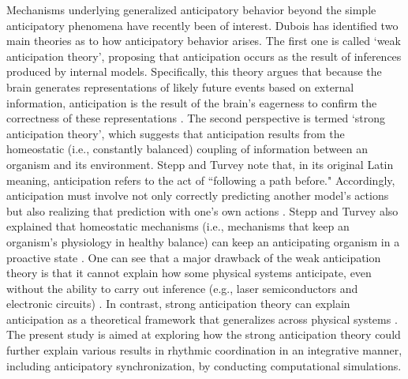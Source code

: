 \documentclass{report}
\begin{document}
Mechanisms underlying generalized anticipatory behavior beyond the simple anticipatory phenomena have recently been of interest. Dubois \cite{dubois2001incursive} has identified two main theories as to how anticipatory behavior arises. The first one is called `weak anticipation theory', proposing that anticipation occurs as the result of inferences produced by internal models. Specifically, this theory argues that because the brain generates representations of likely future events based on external information, anticipation is the result of the brain's eagerness to confirm the correctness of these representations \cite{clark1998being, clark1999towards}. The second perspective is termed `strong anticipation theory', which suggests that anticipation results from the homeostatic (i.e., constantly balanced) coupling of information between an organism and its environment. Stepp and Turvey \cite{stepp2010strong} note that, in its original Latin meaning, anticipation refers to the act of ``following a path before." Accordingly, anticipation must involve not only correctly predicting another model's actions but also realizing that prediction with one's own actions \cite{stepp2010strong}. Stepp and Turvey also explained that homeostatic mechanisms (i.e., mechanisms that keep an organism's physiology in healthy balance) can keep an anticipating organism in a proactive state \cite{stepp2010strong}. One can see that a major drawback of the weak anticipation theory is that it cannot explain how some physical systems anticipate, even without the ability to carry out inference (e.g., laser semiconductors and electronic circuits) \cite{washburn2015harmony, kelso1995dynamic}. In contrast, strong anticipation theory can explain anticipation as a theoretical framework that generalizes across physical systems \cite{stepp2010strong}. The present study is aimed at exploring how the strong anticipation theory could further explain various results in rhythmic coordination in an integrative manner, including anticipatory synchronization, by conducting computational simulations.
\end{document}
